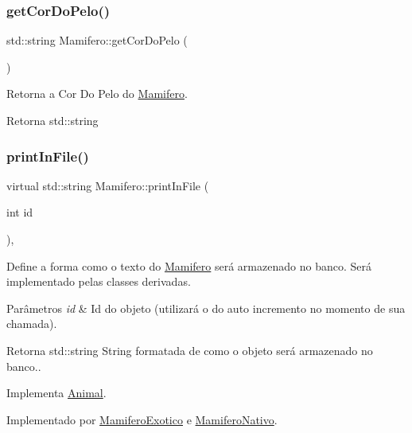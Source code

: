 \subsubsection{\texorpdfstring{get\+Cor\+Do\+Pelo()}{getCorDoPelo()}}
{\footnotesize\ttfamily std\+::string Mamifero\+::get\+Cor\+Do\+Pelo (\begin{DoxyParamCaption}{ }\end{DoxyParamCaption})}



Retorna a Cor Do Pelo do \hyperlink{classMamifero}{Mamifero}. 

\begin{DoxyReturn}{Retorna}
std\+::string 
\end{DoxyReturn}
\mbox{\label{classMamifero_ae91b67a8f0f508793a801aadcaa18570}} 
\subsubsection{\texorpdfstring{print\+In\+File()}{printInFile()}}
{\footnotesize\ttfamily virtual std\+::string Mamifero\+::print\+In\+File (\begin{DoxyParamCaption}\item[{int}]{id }\end{DoxyParamCaption})\hspace{0.3cm}{\ttfamily [protected]}, {}}



Define a forma como o texto do \hyperlink{classMamifero}{Mamifero} será armazenado no banco. Será implementado pelas classes derivadas. 


\begin{DoxyParams}{Parâmetros}
{\em id} & Id do objeto (utilizará o do auto incremento no momento de sua chamada). \\
\hline
\end{DoxyParams}
\begin{DoxyReturn}{Retorna}
std\+::string String formatada de como o objeto será armazenado no banco.. 
\end{DoxyReturn}


Implementa \hyperlink{classAnimal_ac75406040726a6339932d70164cc7242}{Animal}.



Implementado por \hyperlink{classMamiferoExotico_a4ee6f5f4a2917cfdf54304525add0c4a}{Mamifero\+Exotico} e \hyperlink{classMamiferoNativo_ae2f2b00cb6720cea2780ebef78be52ea}{Mamifero\+Nativo}.

